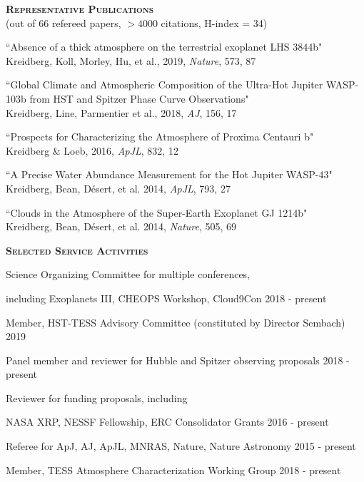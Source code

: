 \documentclass[12pt,letterpaper]{article}
\begin{document}
\textbf{\textsc{Representative Publications}} \\
(out of 66 refereed papers, $>4000$ citations, H-index = 34)
\begin{compactenum}
\item ``Absence of a thick atmosphere on the terrestrial exoplanet LHS 3844b"\\ 
Kreidberg, Koll, Morley, Hu, et al., 2019, \textit{Nature}, 573, 87
                                                                                
\item ``Global Climate and Atmospheric Composition of the Ultra-Hot Jupiter WASP-103b from HST and Spitzer Phase Curve Observations"\\
Kreidberg, Line, Parmentier et al., 2018, \textit{AJ}, 156, 17

\item ``Prospects for Characterizing the Atmosphere of Proxima Centauri b"\\
Kreidberg \& Loeb, 2016, \textit{ApJL}, 832, 12 

\item ``A Precise Water Abundance Measurement for the Hot Jupiter WASP-43"\\
Kreidberg, Bean, D\'esert, et al. 2014, \textit{ApJL}, 793, 27

\item ``Clouds in the Atmosphere of the Super-Earth Exoplanet GJ 1214b"\\
Kreidberg, Bean, D\'esert, et al. 2014, \textit{Nature}, 505, 69

\end{compactenum}


\vspace{3mm}
\textbf{\textsc{Selected Service Activities}} 
\begin{compactitem}
    \item Science Organizing Committee for multiple conferences, 
            \begin{sloppypar}
            including Exoplanets III, CHEOPS Workshop, Cloud9Con \hfill 2018 - present
            \end{sloppypar}
    \item Member, HST-TESS Advisory Committee (constituted by Director Sembach) \hfill 2019
    \item Panel member and reviewer for Hubble and Spitzer observing proposals \hfill 2018 - present
    \item Reviewer for funding proposals, including
            \begin{sloppypar}
            NASA XRP, NESSF Fellowship, ERC Consolidator Grants \hfill 2016 - present
            \end{sloppypar}
    \item Referee for ApJ, AJ, ApJL, MNRAS, Nature, Nature Astronomy \hfill 2015 - present
    \item {Member, TESS Atmosphere Characterization Working Group \hfill 2018 - present}
\end{compactitem}
\vspace{7mm}
\end{document}
